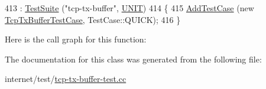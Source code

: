 \begin{DoxyCode}
413     : \hyperlink{classns3_1_1TestSuite_a904b0c40583b744d30908aeb94636d1a}{TestSuite} (\textcolor{stringliteral}{"tcp-tx-buffer"}, \hyperlink{classns3_1_1TestSuite_a1ebfcab34ec8161e085e8e3a1855eae0a3885375a3787abf60431f8454b3cadbd}{UNIT})
414   \{
415     \hyperlink{classns3_1_1TestCase_a3718088e3eefd5d6454569d2e0ddd835}{AddTestCase} (\textcolor{keyword}{new} \hyperlink{classTcpTxBufferTestCase}{TcpTxBufferTestCase}, TestCase::QUICK);
416   \}
\end{DoxyCode}


Here is the call graph for this function\+:




The documentation for this class was generated from the following file\+:\begin{DoxyCompactItemize}
\item 
internet/test/\hyperlink{tcp-tx-buffer-test_8cc}{tcp-\/tx-\/buffer-\/test.\+cc}\end{DoxyCompactItemize}
